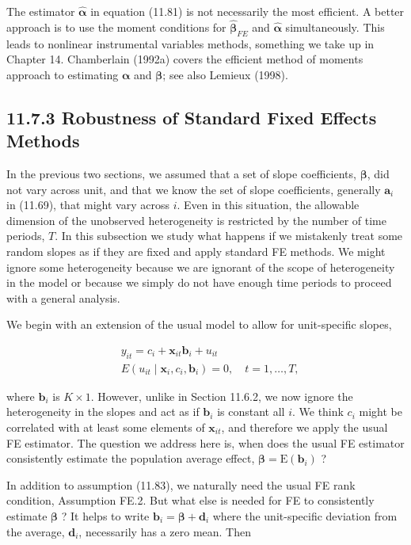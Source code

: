 \documentclass[10pt]{article}
\begin{document}
The estimator $\hat{\boldsymbol{\alpha}}$ in equation (11.81) is not necessarily the most efficient. A better approach is to use the moment conditions for $\hat{\boldsymbol{\beta}}_{F E}$ and $\hat{\boldsymbol{\alpha}}$ simultaneously. This leads to nonlinear instrumental variables methods, something we take up in Chapter 14. Chamberlain (1992a) covers the efficient method of moments approach to estimating $\boldsymbol{\alpha}$ and $\boldsymbol{\beta}$; see also Lemieux (1998).

\subsection*{11.7.3 Robustness of Standard Fixed Effects Methods}
In the previous two sections, we assumed that a set of slope coefficients, $\boldsymbol{\beta}$, did not vary across unit, and that we know the set of slope coefficients, generally $\mathbf{a}_{i}$ in (11.69), that might vary across $i$. Even in this situation, the allowable dimension of the unobserved heterogeneity is restricted by the number of time periods, $T$. In this subsection we study what happens if we mistakenly treat some random slopes as if they are fixed and apply standard FE methods. We might ignore some heterogeneity because we are ignorant of the scope of heterogeneity in the model or because we simply do not have enough time periods to proceed with a general analysis.

We begin with an extension of the usual model to allow for unit-specific slopes,


\begin{align*}
& y_{i t}=c_{i}+\mathbf{x}_{i t} \mathbf{b}_{i}+u_{i t}  \tag{11.82}\\
& E\left(u_{i t} \mid \mathbf{x}_{i}, c_{i}, \mathbf{b}_{i}\right)=0, \quad t=1, \ldots, T, \tag{11.83}
\end{align*}


where $\mathbf{b}_{i}$ is $K \times 1$. However, unlike in Section 11.6.2, we now ignore the heterogeneity in the slopes and act as if $\mathbf{b}_{i}$ is constant all $i$. We think $c_{i}$ might be correlated with at least some elements of $\mathbf{x}_{i t}$, and therefore we apply the usual FE estimator. The question we address here is, when does the usual FE estimator consistently estimate the population average effect, $\boldsymbol{\beta}=\mathrm{E}\left(\mathbf{b}_{i}\right)$ ?

In addition to assumption (11.83), we naturally need the usual FE rank condition, Assumption FE.2. But what else is needed for FE to consistently estimate $\boldsymbol{\beta}$ ? It helps to write $\mathbf{b}_{i}=\boldsymbol{\beta}+\mathbf{d}_{i}$ where the unit-specific deviation from the average, $\mathbf{d}_{i}$, necessarily has a zero mean. Then
\end{document}
